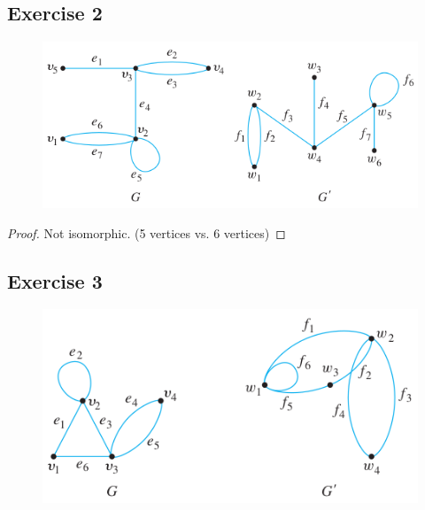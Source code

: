 \documentclass[14pt]{extarticle}
\begin{document}
\subsection{Exercise 2}
\begin{figure}[ht!]
\centering
\includegraphics[scale=0.5]{../images/10.3.2.png}
\end{figure}

\begin{proof}
Not isomorphic. (5 vertices vs. 6 vertices)
\end{proof}

\subsection{Exercise 3}
\begin{figure}[ht!]
\centering
\includegraphics[scale=0.5]{../images/10.3.3.png}
\end{figure}
\end{document}
